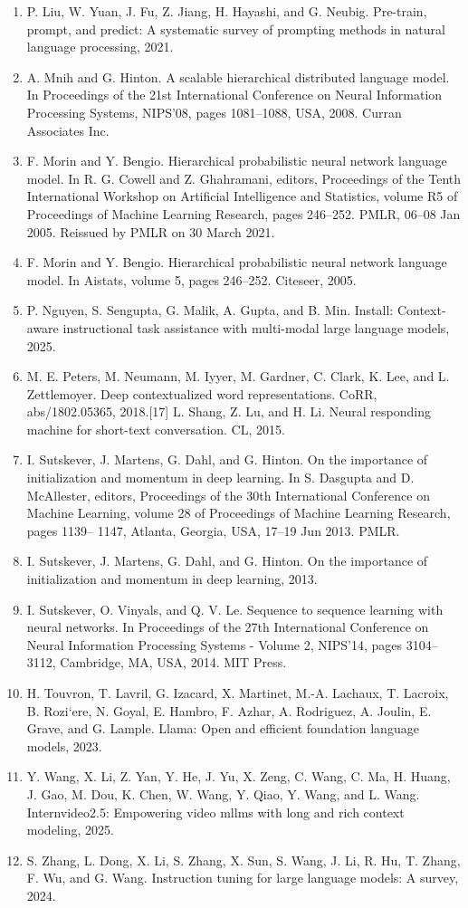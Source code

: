 \documentclass[]{article}
\begin{document}
\begin{enumerate}
\item P. Liu, W. Yuan, J. Fu, Z. Jiang, H. Hayashi, and G. Neubig. Pre-train, prompt, and predict: A
systematic survey of prompting methods in natural language processing, 2021.
\item A. Mnih and G. Hinton. A scalable hierarchical distributed language model. In Proceedings of the 21st
International Conference on Neural Information Processing Systems, NIPS’08, pages 1081–1088, USA,
2008. Curran Associates Inc.
\item F. Morin and Y. Bengio. Hierarchical probabilistic neural network language model. In R. G. Cowell
and Z. Ghahramani, editors, Proceedings of the Tenth International Workshop on Artificial Intelligence
and Statistics, volume R5 of Proceedings of Machine Learning Research, pages 246–252. PMLR, 06–08
Jan 2005. Reissued by PMLR on 30 March 2021.
\item F. Morin and Y. Bengio. Hierarchical probabilistic neural network language model. In Aistats, volume 5,
pages 246–252. Citeseer, 2005.
\item P. Nguyen, S. Sengupta, G. Malik, A. Gupta, and B. Min. Install: Context-aware instructional task
assistance with multi-modal large language models, 2025.
\item M. E. Peters, M. Neumann, M. Iyyer, M. Gardner, C. Clark, K. Lee, and L. Zettlemoyer. Deep
contextualized word representations. CoRR, abs/1802.05365, 2018.[17] L. Shang, Z. Lu, and H. Li. Neural responding machine for short-text conversation. CL, 2015.
\item I. Sutskever, J. Martens, G. Dahl, and G. Hinton. On the importance of initialization and momentum
in deep learning. In S. Dasgupta and D. McAllester, editors, Proceedings of the 30th International
Conference on Machine Learning, volume 28 of Proceedings of Machine Learning Research, pages 1139–
1147, Atlanta, Georgia, USA, 17–19 Jun 2013. PMLR.
\item I. Sutskever, J. Martens, G. Dahl, and G. Hinton. On the importance of initialization and momentum
in deep learning, 2013.
\item I. Sutskever, O. Vinyals, and Q. V. Le. Sequence to sequence learning with neural networks. In
Proceedings of the 27th International Conference on Neural Information Processing Systems - Volume
2, NIPS’14, pages 3104–3112, Cambridge, MA, USA, 2014. MIT Press.
\item H. Touvron, T. Lavril, G. Izacard, X. Martinet, M.-A. Lachaux, T. Lacroix, B. Rozi`ere, N. Goyal,
E. Hambro, F. Azhar, A. Rodriguez, A. Joulin, E. Grave, and G. Lample. Llama: Open and efficient
foundation language models, 2023.
\item Y. Wang, X. Li, Z. Yan, Y. He, J. Yu, X. Zeng, C. Wang, C. Ma, H. Huang, J. Gao, M. Dou, K. Chen,
W. Wang, Y. Qiao, Y. Wang, and L. Wang. Internvideo2.5: Empowering video mllms with long and
rich context modeling, 2025.
\item S. Zhang, L. Dong, X. Li, S. Zhang, X. Sun, S. Wang, J. Li, R. Hu, T. Zhang, F. Wu, and G. Wang.
Instruction tuning for large language models: A survey, 2024.
\end{enumerate}
\end{document}
